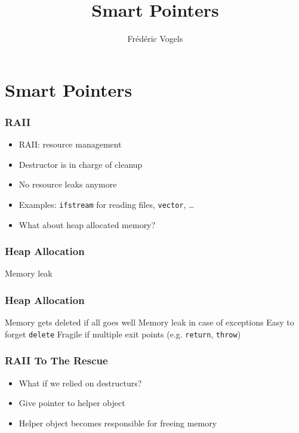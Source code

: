 

\usetikzlibrary{shadows,shapes.multipart}

\title{Smart Pointers}
\author{Fr\'ed\'eric Vogels}


\lstset{language=c++14}



\begin{frame}
  \titlepage
\end{frame}

\section{Smart Pointers}
\frame{\tableofcontents[currentsection]}

\begin{frame}
  \frametitle{RAII}
  \begin{itemize}
    \item RAII: resource management
    \item Destructor is in charge of cleanup
    \item No resource leaks anymore
    \item Examples: {\tt ifstream} for reading files, {\tt vector}, \dots
    \item What about heap allocated memory?
  \end{itemize}
\end{frame}

\begin{frame}
  \frametitle{Heap Allocation}
  \begin{procontralist}
    \con Memory leak
  \end{procontralist}
\end{frame}

\begin{frame}
  \frametitle{Heap Allocation}
  \begin{procontralist}
    \pro Memory gets deleted if all goes well
    \con Memory leak in case of exceptions
    \con Easy to forget {\tt delete}
    \con Fragile if multiple exit points (e.g. {\tt return}, {\tt throw})
  \end{procontralist}
\end{frame}

\begin{frame}
  \frametitle{RAII To The Rescue}
  \begin{itemize}
    \item What if we relied on destructurs?
    \item Give pointer to helper object
    \item Helper object becomes responsible for freeing memory
  \end{itemize}
\end{frame}

